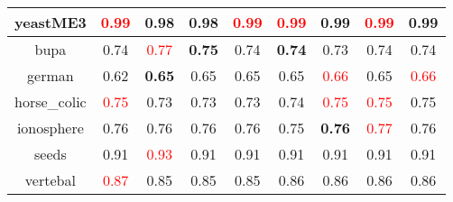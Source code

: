 \documentclass{article}%
\begin{document}
\begin{tabular}{c|cccccccc}
\hline%
yeastME3&\textcolor{red}{ 
0.99
}&0.98&0.98&\textcolor{red}{ 
0.99
}&\textcolor{red}{ 
0.99
}&0.99&\textcolor{red}{ 
0.99
}&0.99\\%
\hline%
bupa&0.74&\textcolor{red}{ 
0.77
}&\textbf{0.75}&0.74&\textbf{0.74}&0.73&0.74&0.74\\%
\hline%
german&0.62&\textbf{0.65}&0.65&0.65&0.65&\textcolor{red}{ 
0.66
}&0.65&\textcolor{red}{ 
0.66
}\\%
\hline%
horse\_colic&\textcolor{red}{ 
0.75
}&0.73&0.73&0.73&0.74&\textcolor{red}{ 
0.75
}&\textcolor{red}{ 
0.75
}&0.75\\%
\hline%
ionosphere&0.76&0.76&0.76&0.76&0.75&\textbf{0.76}&\textcolor{red}{ 
0.77
}&0.76\\%
\hline%
seeds&0.91&\textcolor{red}{ 
0.93
}&0.91&0.91&0.91&0.91&0.91&0.91\\%
\hline%
vertebal&\textcolor{red}{ 
0.87
}&0.85&0.85&0.85&0.86&0.86&0.86&0.86\\%
\hline%
\end{tabular}

%
\end{document}
